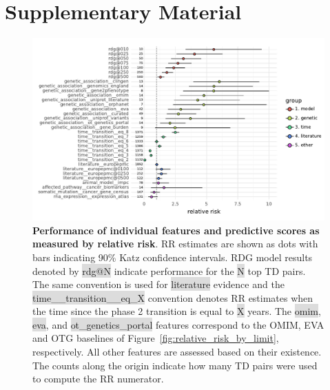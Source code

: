 \documentclass{article}
\begin{document}
\clearpage



\clearpage

\section{Supplementary Material}

\pagebreak

\begin{figure}[H]
  \centering
  \captionsetup{width=.9\linewidth}
  \includegraphics[width=1\textwidth]{relative_risk_core_features.pdf}
  \caption{
    \textbf{Performance of individual features and predictive scores as measured by relative risk}.
    RR estimates are shown as dots with bars indicating 90\% Katz confidence intervals.
    RDG model results denoted by \colorbox{Gainsboro}{rdg@N} indicate performance for the \colorbox{Gainsboro}{N} top TD pairs. The same convention is used for \colorbox{Gainsboro}{literature} evidence and the \colorbox{Gainsboro}{time\_\_transition\_\_eq\_X} convention denotes RR estimates when the time since the phase 2 transition is equal to \colorbox{Gainsboro}{X} years. The \colorbox{Gainsboro}{omim}, \colorbox{Gainsboro}{eva}, and \colorbox{Gainsboro}{ot\_genetics\_portal} features correspond to the OMIM, EVA and OTG baselines of Figure~\ref{fig:relative_risk_by_limit}, respectively. All other features are assessed based on their existence. The counts along the origin indicate how many TD pairs were used to compute the RR numerator.
  }
  \label{fig:relative_risk_core_features}
\end{figure}

\pagebreak
\end{document}
